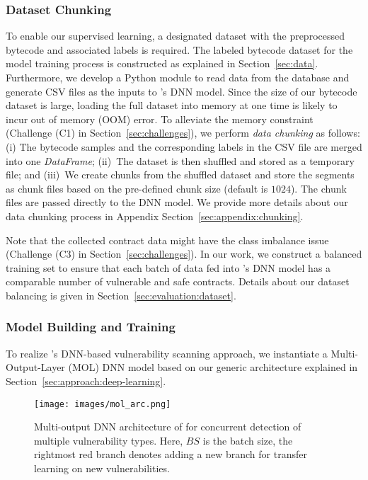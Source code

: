 \subsubsection{Dataset Chunking}
To enable our supervised learning, a designated dataset with the preprocessed bytecode and associated labels is required. The labeled bytecode dataset for the model training process is constructed as explained in Section~\ref{sec:data}.
Furthermore, we develop a Python module to read data from the database and generate CSV files as the inputs to \sys{}'s DNN model.  
Since the size of our bytecode dataset is large, loading the full dataset into memory at one time is likely to incur out of memory (OOM) error.
To alleviate the memory constraint (Challenge (C1) in Section~\ref{sec:challenges}), we perform \textit{data chunking} as follows:
(i) The bytecode samples and the corresponding labels in the CSV file are merged into one \textit{DataFrame}; (ii)~The dataset is then shuffled and stored as a temporary file; and (iii)~We create chunks from the shuffled dataset and store the segments as chunk files based on the pre-defined chunk size (default is $1024$). The chunk files are passed directly to the DNN model.
We provide more details about our data chunking process in Appendix Section~\ref{sec:appendix:chunking}. 

Note that the collected contract data might have the class imbalance issue~\cite{rw_contractward} (Challenge (C3) in Section~\ref{sec:challenges}). In our work, we construct a balanced training set to ensure that each batch of data fed into \sys{}'s DNN model has a comparable number of vulnerable and safe contracts. Details about our dataset balancing is given in Section~\ref{sec:evaluation:dataset}. 

\subsubsection{Model Building and Training}
To realize \sys{}'s DNN-based vulnerability scanning approach, we instantiate a Multi-Output-Layer (MOL) DNN model based on our generic architecture explained in Section~\ref{sec:approach:deep-learning}.

\begin{figure}[ht!]
  \centering
  \texttt{[image: images/mol\_arc.png]}
  \vspace{-0.8em}
  \caption{Multi-output DNN architecture of \sys{} for concurrent detection of multiple vulnerability types. Here, $BS$ is the batch size, the rightmost red branch denotes adding a new branch for transfer learning on new vulnerabilities. }
    \label{fig:implementation:mol-gru}
    \vspace{0.8em}
\end{figure} 

